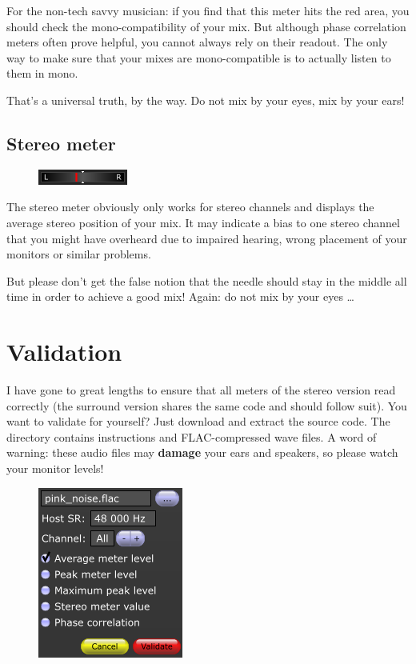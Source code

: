 For the non-tech savvy musician: if you find that this meter hits the
red area, you should check the mono-compatibility of your mix.  But
although phase correlation meters often prove helpful, you cannot
always rely on their readout.  The only way to make sure that your
mixes are mono-compatible is to actually listen to them in mono.

That's a universal truth, by the way.  Do not mix by your eyes, mix by
your ears!

\section{Stereo meter}

\begin{figure}
  \includegraphics[scale=\screenshotscale,clip]{include/images/stereo_meter.png}
\end{figure}

The stereo meter obviously only works for stereo channels and displays
the average stereo position of your mix.  It may indicate a bias to
one stereo channel that you might have overheard due to impaired
hearing, wrong placement of your monitors or similar problems.

But please don't get the false notion that the needle should stay in
the middle all time in order to achieve a good mix!  Again: do not mix
by your eyes \dots

\chapter{Validation}
\label{chap:validation}

I have gone to great lengths to ensure that all meters of the stereo
version read correctly (the surround version shares the same code and
should follow suit).  You want to validate for yourself?  Just
download and extract the source code.  The directory 
contains instructions and FLAC-compressed wave files.  A word of
warning: these audio files may \textbf{damage} your ears and speakers,
so please watch your monitor levels!

\begin{figure}
  \includegraphics[scale=\screenshotscale,clip]{include/images/dialog_validation.png}
\end{figure}

